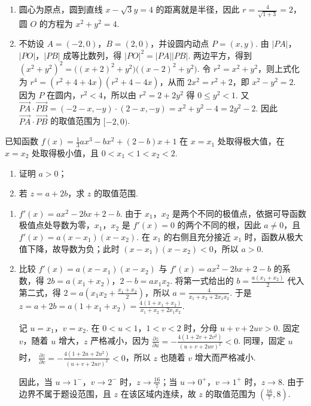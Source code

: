 \begin{solution}
\begin{enumerate}
\item 圆心为原点，圆到直线 \(x-\sqrt{3}y=4\) 的距离就是半径，因此 \(r=\frac{4}{\sqrt{1+3}}=2\)，圆 \(O\) 的方程为 \(x^2+y^2=4\).
\item 不妨设 \(A=(-2,0)\)，\(B=(2,0)\)，并设圆内动点 \(P=(x,y)\). 由 \(|PA|\)，\(|PO|\)，\(|PB|\) 成等比数列，得 \(|PO|^2=|PA||PB|\). 两边平方，得到 \((x^2+y^2)^2=\bigl((x+2)^2+y^2\bigr)\bigl((x-2)^2+y^2\bigr)\). 令 \(r^2=x^2+y^2\)，则上式化为 \(r^4=(r^2+4+4x)(r^2+4-4x)\)，从而 \(2x^2=r^2+2\)，即 \(x^2-y^2=2\). 因为 \(P\) 在圆内，\(r^2<4\)，所以由 \(r^2=2+2y^2\) 得 \(0\leqslant y^2<1\). 又 \(\overrightarrow{PA}\cdot\overrightarrow{PB}=(-2-x,-y)\cdot(2-x,-y)=x^2+y^2-4=2y^2-2\). 因此 \(\overrightarrow{PA}\cdot\overrightarrow{PB}\) 的取值范围为 \([-2,0)\).
\end{enumerate}
\end{solution}

\begin{problem}
已知函数 \(f(x)=\frac{1}{3}ax^3-bx^2+(2-b)x+1\) 在 \(x=x_1\) 处取得极大值，在 \(x=x_2\) 处取得极小值，且 \(0<x_1<1<x_2<2\).

\begin{enumerate}
\item 证明 \(a>0\)；
\item 若 \(z=a+2b\)，求 \(z\) 的取值范围.
\end{enumerate}
\end{problem}

\begin{solution}
\begin{enumerate}
\item \(f'(x)=ax^2-2bx+2-b\). 由于 \(x_1\)，\(x_2\) 是两个不同的极值点，依据可导函数极值点处导数为零，\(x_1\)，\(x_2\) 是 \(f'(x)=0\) 的两个不同的根，因此 \(a\ne0\)，且 \(f'(x)=a(x-x_1)(x-x_2)\). 在 \(x_1\) 的右侧且充分接近 \(x_1\) 时，函数从极大值下降，故导数为负；此时 \((x-x_1)(x-x_2)<0\)，所以 \(a>0\).

\item 比较 \(f'(x)=a(x-x_1)(x-x_2)\) 与 \(f'(x)=ax^2-2bx+2-b\) 的系数，得
\(2b=a(x_1+x_2)\)，\(2-b=ax_1x_2\). 将第一式给出的 \(b=\frac{a(x_1+x_2)}{2}\) 代入第二式，得
\(2=a\left(x_1x_2+\frac{x_1+x_2}{2}\right)\)，所以
\(a=\frac{4}{x_1+x_2+2x_1x_2}\). 于是
\(z=a+2b=a\left(1+x_1+x_2\right)=\frac{4(1+x_1+x_2)}{x_1+x_2+2x_1x_2}\).

记 \(u=x_1\)，\(v=x_2\). 在 \(0<u<1\)，\(1<v<2\) 时，分母 \(u+v+2uv>0\). 固定 \(v\)，随着 \(u\) 增大，\(z\) 严格减小，因为
\(\frac{\partial z}{\partial u}=-\frac{4(1+2v+2v^2)}{(u+v+2uv)^2}<0\). 同理，固定 \(u\) 时，
\(\frac{\partial z}{\partial v}=-\frac{4(1+2u+2u^2)}{(u+v+2uv)^2}<0\)，所以 \(z\) 也随着 \(v\) 增大而严格减小.

因此，当 \(u\to1^-\)，\(v\to2^-\) 时，\(z\to\frac{16}{7}\)；当 \(u\to0^+\)，\(v\to1^+\) 时，\(z\to8\). 由于边界不属于题设范围，且 \(z\) 在该区域内连续，故 \(z\) 的取值范围为 \(\left(\frac{16}{7},8\right)\).
\end{enumerate}
\end{solution}
